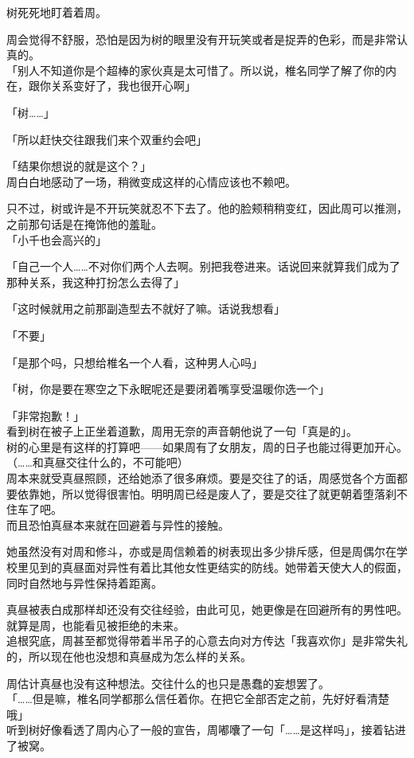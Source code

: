 树死死地盯着着周。

周会觉得不舒服，恐怕是因为树的眼里没有开玩笑或者是捉弄的色彩，而是非常认真的。\\

「别人不知道你是个超棒的家伙真是太可惜了。所以说，椎名同学了解了你的内在，跟你关系变好了，我也很开心啊」

「树……」

「所以赶快交往跟我们来个双重约会吧」

「结果你想说的就是这个？」\\

周白白地感动了一场，稍微变成这样的心情应该也不赖吧。

只不过，树或许是不开玩笑就忍不下去了。他的脸颊稍稍变红，因此周可以推测，之前那句话是在掩饰他的羞耻。\\

「小千也会高兴的」

「自己一个人……不对你们两个人去啊。别把我卷进来。话说回来就算我们成为了那种关系，我这种打扮怎么去得了」

「这时候就用之前那副造型去不就好了嘛。话说我想看」

「不要」

「是那个吗，只想给椎名一个人看，这种男人心吗」

「树，你是要在寒空之下永眠呢还是要闭着嘴享受温暖你选一个」

「非常抱歉！」\\

看到树在被子上正坐着道歉，周用无奈的声音朝他说了一句「真是的」。\\

树的心里是有这样的打算吧——如果周有了女朋友，周的日子也能过得更加开心。\\

（……和真昼交往什么的，不可能吧）\\

周本来就受真昼照顾，还给她添了很多麻烦。要是交往了的话，周感觉各个方面都要依靠她，所以觉得很害怕。明明周已经是废人了，要是交往了就更朝着堕落刹不住车了吧。\\

而且恐怕真昼本来就在回避着与异性的接触。

她虽然没有对周和修斗，亦或是周信赖着的树表现出多少排斥感，但是周偶尔在学校里见到的真昼面对异性有着比其他女性更结实的防线。她带着天使大人的假面，同时自然地与异性保持着距离。

真昼被表白成那样却还没有交往经验，由此可见，她更像是在回避所有的男性吧。\\

就算是周，也能看见被拒绝的未来。\\

追根究底，周甚至都觉得带着半吊子的心意去向对方传达「我喜欢你」是非常失礼的，所以现在他也没想和真昼成为怎么样的关系。

周估计真昼也没有这种想法。交往什么的也只是愚蠢的妄想罢了。\\

「……但是嘛，椎名同学都那么信任着你。在把它全部否定之前，先好好看清楚哦」\\

听到树好像看透了周内心了一般的宣告，周嘟囔了一句「……是这样吗」，接着钻进了被窝。
